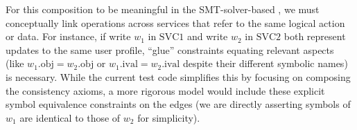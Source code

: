 
For this composition to be meaningful in the SMT-solver-based
\sysname{}, we must
conceptually link operations across services that refer to the same logical
action or data. For instance, if write $w_1$ in $\text{SVC}1$ and
write $w_2$ in $\text{SVC}2$ both
represent updates to the same user profile, ``glue'' constraints
equating relevant
aspects (like $w_1.\text{obj} = w_2.\text{obj}$ or $w_1.\text{ival} =
w_2.\text{ival}$ despite their different symbolic names) is necessary.
While the current test code
simplifies this by focusing on composing the consistency axioms, a more rigorous
model would include these explicit symbol equivalence constraints on the edges
(we are directly asserting symbols of $w_1$ are identical to those of $w_2$ for
simplicity).


